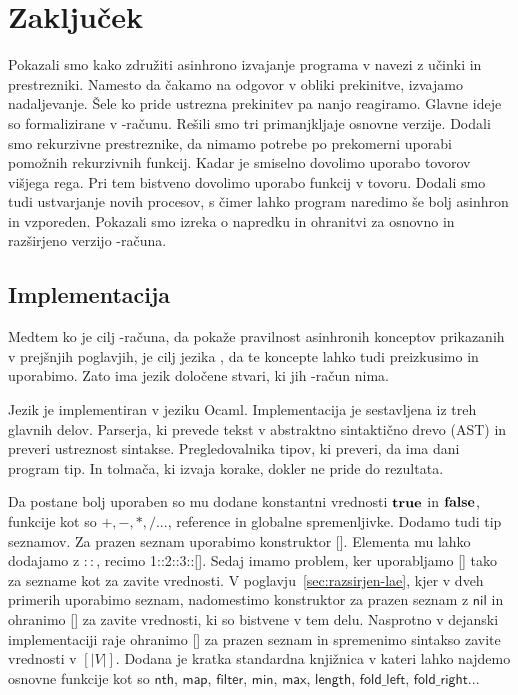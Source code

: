 \section{Zaključek}

Pokazali smo kako združiti asinhrono izvajanje programa v navezi z učinki in prestrezniki. Namesto da čakamo na odgovor v obliki prekinitve, izvajamo nadaljevanje. Šele ko pride ustrezna prekinitev pa nanjo reagiramo. Glavne ideje so formalizirane v \lae-računu. Rešili smo tri primanjkljaje osnovne verzije. Dodali smo rekurzivne prestreznike, da nimamo potrebe po prekomerni uporabi pomožnih rekurzivnih funkcij. Kadar je smiselno dovolimo uporabo tovorov višjega rega. Pri tem bistveno dovolimo uporabo funkcij v tovoru. Dodali smo tudi ustvarjanje novih procesov, s čimer lahko program naredimo še bolj asinhron in vzporeden. Pokazali smo izreka o napredku in ohranitvi za osnovno in razširjeno verzijo \lae-računa.

\subsection{Implementacija}\label{sec:implementacija}

Medtem ko je cilj \lae-računa, da pokaže pravilnost asinhronih konceptov prikazanih v prejšnjih poglavjih, je cilj jezika \aeff{}, da te koncepte lahko tudi preizkusimo in uporabimo. Zato ima jezik \aeff{} določene stvari, ki jih \lae-račun nima.

Jezik \aeff{} je implementiran v jeziku Ocaml. Implementacija je sestavljena iz treh glavnih delov.
Parserja, ki prevede tekst v abstraktno sintaktično drevo (AST) in preveri ustreznost sintakse.  
Pregledovalnika tipov, ki preveri, da ima dani program tip.
In tolmača, ki izvaja korake, dokler ne pride do rezultata.


Da \aeff{} postane bolj uporaben so mu dodane konstantni vrednosti $\mathbf{true}$ in $\mathbf{false}$, funkcije kot so $+, -, *, / ...$, reference in globalne spremenljivke.
Dodamo tudi tip seznamov. Za prazen seznam uporabimo konstruktor []. Elementa mu lahko dodajamo z $::$, recimo 1::2::3::[].
Sedaj imamo problem, ker uporabljamo [] tako za sezname kot za zavite vrednosti.
V poglavju~\ref{sec:razsirjen-lae}, kjer v dveh primerih uporabimo seznam, nadomestimo konstruktor za prazen seznam z $\mathsf{nil}$ in ohranimo [] za zavite vrednosti, ki so bistvene v tem delu.
Nasprotno v dejanski implementaciji \aeff{} raje ohranimo [] za prazen seznam in spremenimo sintakso zavite vrednosti v $[|V|]$. 
Dodana je kratka standardna knjižnica v kateri lahko najdemo osnovne funkcije kot so $\mathsf{nth}$, $\mathsf{map}$, $\mathsf{filter}$, $\mathsf{min}$, $\mathsf{max}$, $\mathsf{length}$, $\mathsf{fold\_left}$, $\mathsf{fold\_right}$...

